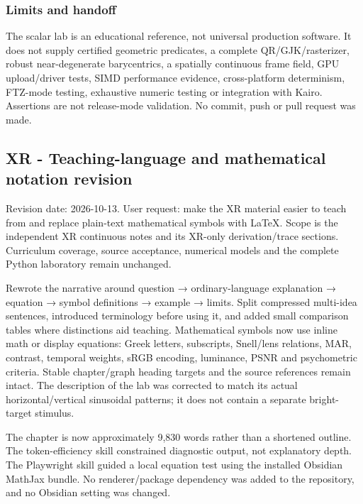 \subsubsection{Limits and handoff}\label{appendix-a103e7846d21-limits-and-handoff}

The scalar lab is an educational reference, not universal production software. It does not supply certified geometric predicates, a complete QR/GJK/rasterizer, robust near-degenerate barycentrics, a spatially continuous frame field, GPU upload/driver tests, SIMD performance evidence, cross-platform determinism, FTZ-mode testing, exhaustive numeric testing or integration with Kairo. Assertions are not release-mode validation. No commit, push or pull request was made.

\subsection{XR - Teaching-language and mathematical notation revision}\label{appendix-a103e7846d21-xr---teaching-language-and-mathematical-notation-revision}

Revision date: 2026-10-13. User request: make the XR material easier to teach from and replace plain-text mathematical symbols with LaTeX. Scope is the independent XR continuous notes and its XR-only derivation/trace sections. Curriculum coverage, source acceptance, numerical models and the complete Python laboratory remain unchanged.

Rewrote the narrative around question → ordinary-language explanation → equation → symbol definitions → example → limits. Split compressed multi-idea sentences, introduced terminology before using it, and added small comparison tables where distinctions aid teaching. Mathematical symbols now use inline math or display equations: Greek letters, subscripts, Snell/lens relations, MAR, contrast, temporal weights, sRGB encoding, luminance, PSNR and psychometric criteria. Stable chapter/graph heading targets and the source references remain intact. The description of the lab was corrected to match its actual horizontal/vertical sinusoidal patterns; it does not contain a separate bright-target stimulus.

The chapter is now approximately 9,830 words rather than a shortened outline. The token-efficiency skill constrained diagnostic output, not explanatory depth. The Playwright skill guided a local equation test using the installed Obsidian MathJax bundle. No renderer/package dependency was added to the repository, and no Obsidian setting was changed.

